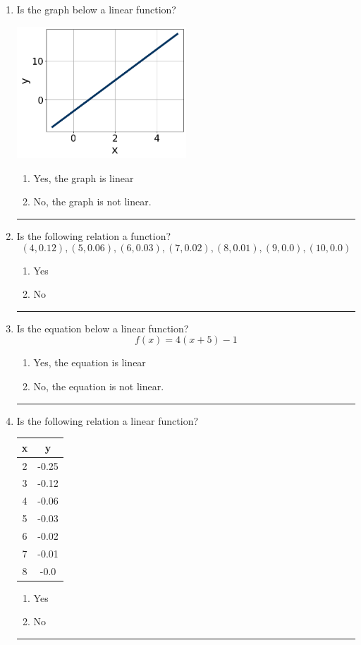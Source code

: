 \documentclass[14pt]{extbook}
\newcommand{\litem}[1]{\item#1\hspace*{-1cm}\rule{\textwidth}{0.4pt}}
\begin{document}
\begin{enumerate}
{\begin{enumerate}[label=\Alph*.]
\end{enumerate} }
\litem{
Is the graph below a linear function?
\begin{center}
    \includegraphics[width=0.5\textwidth]{../Figures/MA_8_F_1_2_graphY.png}
\end{center}
\begin{enumerate}[label=\Alph*.]
\item Yes, the graph is linear
\item No, the graph is not linear.

\end{enumerate} }
\litem{
Is the following relation a function?\[ (4, 0.12), (5, 0.06), (6, 0.03), (7, 0.02), (8, 0.01), (9, 0.0), (10, 0.0) \]\begin{enumerate}[label=\Alph*.]
\item Yes
\item No

\end{enumerate} }
\litem{
Is the equation below a linear function?\[ f(x) = 4(x + 5)-1 \]\begin{enumerate}[label=\Alph*.]
\item Yes, the equation is linear
\item No, the equation is not linear.

\end{enumerate} }
\litem{
Is the following relation a linear function?

\begin{tabular}{c|c}
x &y\tabularnewline \hline
2 &-0.25\tabularnewline \hline
3 &-0.12\tabularnewline \hline
4 &-0.06\tabularnewline \hline
5 &-0.03\tabularnewline \hline
6 &-0.02\tabularnewline \hline
7 &-0.01\tabularnewline \hline
8 &-0.0\end{tabular}\begin{enumerate}[label=\Alph*.]
\item Yes
\item No

\end{enumerate} }
\end{enumerate}
\end{document}
